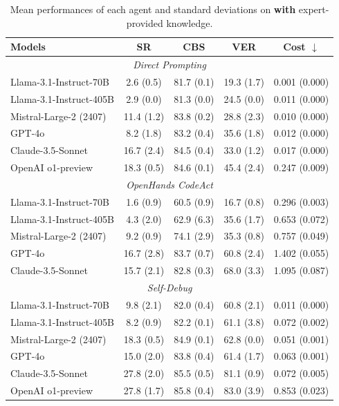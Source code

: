 \begin{table}[h]
\small
\centering
\caption{Mean performances of each agent and standard deviations on \bench \textbf{with} expert-provided knowledge. }
\vspace{-5.5pt}
\begin{tabular}{lcccc}
\toprule
\textbf{Models} & \textbf{SR} & \textbf{CBS} & \textbf{VER} & \textbf{Cost $\downarrow$} \\
\midrule
\multicolumn{5}{c}{\textit{Direct Prompting}} \\
\midrule
Llama-3.1-Instruct-70B & 2.6 (0.5) & 81.7 (0.1) & 19.3 (1.7) & 0.001 (0.000) \\
Llama-3.1-Instruct-405B & 2.9 (0.0) & 81.3 (0.0) & 24.5 (0.0) & 0.011 (0.000) \\
Mistral-Large-2 (2407) & 11.4 (1.2) & 83.8 (0.2) & 28.8 (2.3) & 0.010 (0.000) \\
\midrule
GPT-4o & 8.2 (1.8) & 83.2 (0.4) & 35.6 (1.8) & 0.012 (0.000) \\
Claude-3.5-Sonnet & 16.7 (2.4) & 84.5 (0.4) & 33.0 (1.2) & 0.017 (0.000) \\
\rowcolor{mygray}
OpenAI o1-preview & 18.3 (0.5) & 84.6 (0.1) & 45.4 (2.4) & 0.247 (0.009) \\
\midrule
\multicolumn{5}{c}{\textit{OpenHands CodeAct}} \\
\midrule
Llama-3.1-Instruct-70B & 1.6 (0.9) & 60.5 (0.9) & 16.7 (0.8) & 0.296 (0.003) \\
Llama-3.1-Instruct-405B & 4.3 (2.0) & 62.9 (6.3) & 35.6 (1.7) & 0.653 (0.072) \\			
Mistral-Large-2 (2407) & 9.2 (0.9) & 74.1 (2.9) & 35.3 (0.8) & 0.757 (0.049) \\
\midrule
GPT-4o & 16.7 (2.8) & 83.7 (0.7) & 60.8 (2.4) & 1.402 (0.055) \\
Claude-3.5-Sonnet & 15.7 (2.1) & 82.8 (0.3) & 68.0 (3.3) & 1.095 (0.087) \\
\midrule
\multicolumn{5}{c}{\textit{Self-Debug}} \\
\midrule
Llama-3.1-Instruct-70B & 9.8 (2.1) & 82.0 (0.4) & 60.8 (2.1) & 0.011 (0.000) \\
Llama-3.1-Instruct-405B & 8.2 (0.9) & 82.2 (0.1) & 61.1 (3.8) & 0.072 (0.002) \\
Mistral-Large-2 (2407) & 18.3 (0.5) & 84.9 (0.1) & 62.8 (0.0) & 0.051 (0.001) \\
\midrule
GPT-4o & 15.0 (2.0) & 83.8 (0.4) & 61.4 (1.7) & 0.063 (0.001) \\
Claude-3.5-Sonnet & 27.8 (2.0) & 85.5 (0.5) & 81.1 (0.9) & 0.072 (0.005) \\
\rowcolor{mygray}
OpenAI o1-preview & 27.8 (1.7) & 85.8 (0.4) & 83.0 (3.9) & 0.853 (0.023) \\
\bottomrule
\end{tabular}
\label{tab:mean_std_use_know}
\vspace{-11pt}
\end{table}